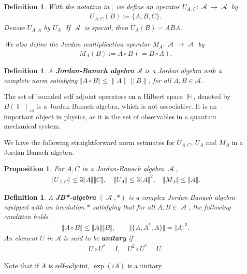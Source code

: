 \documentclass{article}
\theoremstyle{plain} %
\newtheorem{prop}[thm]{Proposition}
\newtheorem{defn}[thm]{Definition}
\numberwithin{equation}{section}
\DeclareMathOperator{\Hdb}{{\mathbb H}}
\DeclareMathOperator{\Al}{{\mathcal A}}
\begin{document}
\begin{defn}\label{defn:uop} 
With the notation in {\rm {}}, we define an operator $U_{A, C}:\Al \to \Al$ by 
\begin{align}\label{notion:uop}
U_{A, C}(B):=\{A,B, C\}.
\end{align}
Denote $U_{A, A}$ by $U_A.$
If $\Al$ is special, then $U_A(B)=ABA.$ 

We also define the Jordan multiplication operator $M_A:\Al \to \Al$ by
\begin{align}\label{notion:mtop}
M_A(B):=A\circ B \, (=B\circ A).
\end{align}
\end{defn}

 


\begin{defn}
    A \textbf{Jordan-Banach algebra} $\mathcal{A}$ is a Jordan algebra with a complete norm satisfying $\Vert A\circ B\Vert \leq \|A\|\|B\|$, for all $A,B\in\mathcal{A}$. 
\end{defn}

The set of bounded self adjoint operators on a Hilbert space $\Hdb$, denoted by $B(\Hdb)_{sa}$ is a Jordan Banach-algebra, which is not associative. It is an important object in physics, as it is the set of observables in a quantum mechanical system. 

We have the following straightforward norm estimates for $U_{A, C}$, $U_A$ and $M_A$ in a Jordan-Banach algebra.
\begin{prop}\label{prop:uopmop}
For $A, C$ in a Jordan-Banach algebra $\Al,$ 
\begin{align}
   \Vert U_{A, C}\Vert \le 3\Vert A\Vert\Vert C\Vert, \quad
   \Vert U_{A}\Vert \le 3\Vert A\Vert^2, \quad  \Vert M_A\Vert \le \Vert A\Vert.
\end{align}
\end{prop}

\begin{defn}\label{defn:JB*}   
    A \textbf{JB*-algebra} $(\Al,*)$ is a complex Jordan-Banach algebra equipped with an involution $*$ satisfying that for all $A,B\in\Al$, the following condition holds 
    \begin{align*}
     \Vert A\circ B\Vert\leq \Vert A\Vert \Vert B\Vert,\quad  \quad \Vert \{A, A^*, A\}\Vert=\Vert A\Vert^3.    
    \end{align*}    
    An element $U$ in $\mathcal{A}$ is said to be \textbf{unitary} if 
    \begin{align*}
    U\circ U^*=I, \quad U^2\circ U^*=U.  
    \end{align*}
\end{defn}
Note that if $A$ is self-adjoint, $\displaystyle \exp(iA)$ is a unitary. 
\end{document}
